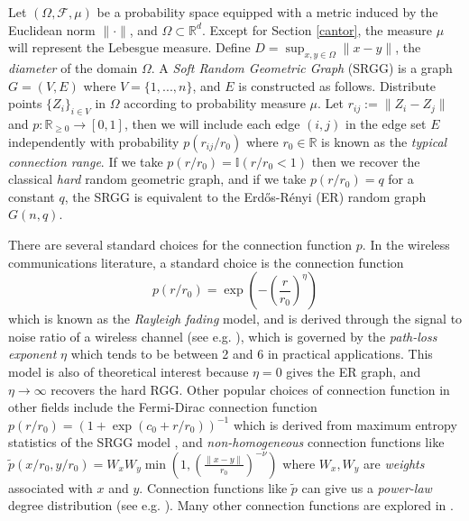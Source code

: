 \documentclass{article}
\newcommand{\rayleigh}[2]{\exp\left(-\left(\frac{#1}{r_0}\right)^{#2}\right)}
\newcommand{\tti}{\rightarrow\infty}
\begin{document}
Let $(\Omega, \mathcal{F}, \mu)$ be a probability space equipped with a metric induced by the Euclidean norm $\|\cdot\|$, and $\Omega \subset \mathbb{R}^d$. Except for Section \ref{cantor}, the measure $\mu$ will represent the Lebesgue measure. Define $D = \sup_{x,y \in \Omega}\|x-y\|$, the \textit{diameter} of the domain $\Omega$. A \textit{Soft Random Geometric Graph} (SRGG) is a graph $G = (V,E)$ where $V = \{1,...,n\}$, and $E$ is constructed as follows. Distribute points $\{Z_i\}_{i\in V}$ in $\Omega$ according to probability measure $\mu$. Let $r_{ij} := \|Z_i-Z_j\|$ and $p : \mathbb{R}_{\geq 0}  \rightarrow [0,1]$, then we will include each edge $(i,j)$ in the edge set $E$ independently with probability $p(r_{ij}/r_0)$ where $r_0 \in \mathbb{R}$ is known as the \textit{typical connection range}. If we take $p(r/r_0) = \mathbb{I}(r/r_0<1)$ then we recover the classical \textit{hard} random geometric graph, and if we take $p(r/r_0) = q$ for a constant $q$, the SRGG is equivalent to the Erd\H os-R\'enyi (ER) random graph $G(n,q)$. \newline

There are several standard choices for the connection function $p$. In the wireless communications literature, a standard choice is the connection function
\begin{equation}
    \label{rayleigh}
    p(r/r_0) = \rayleigh{r}{\eta}
\end{equation}
which is known as the \textit{Rayleigh fading} model, and is derived through the signal to noise ratio of a wireless channel (see e.g. \cite{haenggi2009stochastic}), which is governed by the \textit{path-loss exponent} $\eta$ which tends to be between 2 and 6 in practical applications. This model is also of theoretical interest because $\eta = 0$ gives the ER graph, and $\eta \tti$ recovers the hard RGG. Other popular choices of connection function in other fields include the Fermi-Dirac connection function $p(r/r_0) = (1+\exp(c_0 + r/r_0))^{-1}$ which is derived from maximum entropy statistics of the SRGG model \cite{bianconi2009entropy}, and \textit{non-homogeneous} connection functions like $\tilde{p}(x/r_0, y/r_0) = W_xW_y\min\left(1, \left(\frac{\|x-y\|}{r_0}\right)^{-\nu}\right)$ where $W_x,W_y$ are \textit{weights} associated with $x$ and $y$. Connection functions like $\tilde{p}$ can give us a \textit{power-law} degree distribution (see e.g. \cite{gracar2022chemical}). Many other connection functions are explored in \cite{dettmann2016random}. \newline
\end{document}
